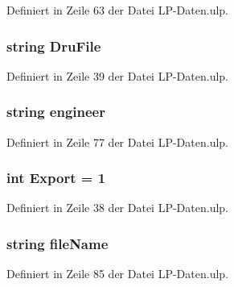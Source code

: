 Definiert in Zeile 63 der Datei L\+P-\/\+Daten.\+ulp.

\hypertarget{_l_p-_daten_8ulp_a7c0022cc032cc2fde01371951fae88b5}{}
\subsubsection[{Dru\+File}]{\setlength{\rightskip}{0pt plus 5cm}string Dru\+File}\label{_l_p-_daten_8ulp_a7c0022cc032cc2fde01371951fae88b5}


Definiert in Zeile 39 der Datei L\+P-\/\+Daten.\+ulp.

\hypertarget{_l_p-_daten_8ulp_a631ee32a616cc0d4795fdaeacb8a01a8}{}
\subsubsection[{engineer}]{\setlength{\rightskip}{0pt plus 5cm}string engineer}\label{_l_p-_daten_8ulp_a631ee32a616cc0d4795fdaeacb8a01a8}


Definiert in Zeile 77 der Datei L\+P-\/\+Daten.\+ulp.

\hypertarget{_l_p-_daten_8ulp_adf2045ae5ac7e107d6e841f6c9d3cbce}{}
\subsubsection[{Export}]{\setlength{\rightskip}{0pt plus 5cm}int Export = 1}\label{_l_p-_daten_8ulp_adf2045ae5ac7e107d6e841f6c9d3cbce}


Definiert in Zeile 38 der Datei L\+P-\/\+Daten.\+ulp.

\hypertarget{_l_p-_daten_8ulp_a71f006e8d6ac2a5d94354155a0da69f8}{}
\subsubsection[{file\+Name}]{\setlength{\rightskip}{0pt plus 5cm}string file\+Name}\label{_l_p-_daten_8ulp_a71f006e8d6ac2a5d94354155a0da69f8}


Definiert in Zeile 85 der Datei L\+P-\/\+Daten.\+ulp.


